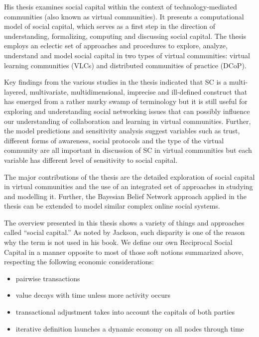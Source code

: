 \documentclass[10pt,oneside]{memoir}
\begin{document}
\begin{Spacing}{2}
His thesis examines social capital within the context of technology-mediated communities (also known as virtual communities). It presents a computational model of social capital, which serves as a first step in the direction of understanding, formalizing, computing and discussing social capital. The thesis employs an eclectic set of approaches and procedures to explore, analyze, understand and model social capital in two types of virtual communities: virtual learning communities (VLCs) and distributed communities of practice (DCoP).


Key findings from the various studies in the thesis indicated that SC is a multi-layered, multivariate, multidimensional, imprecise and ill-defined construct that has emerged from a rather murky swamp of terminology but it is still useful for exploring and understanding social networking issues that can possibly influence our understanding of collaboration and learning in virtual communities. Further, the model predictions and sensitivity analysis suggest variables such as trust, different forms of awareness, social protocols and the type of the virtual community are all important in discussion of SC in virtual communities but each variable has different level of sensitivity to social capital.


The major contributions of the thesis are the detailed exploration of social capital in virtual communities and the use of an integrated set of approaches in studying and modelling it. Further, the Bayesian Belief Network approach applied in the thesis can be extended to model similar complex online social systems.


The overview presented in this thesis shows a variety of things and approaches called ``social capital.''  As noted by Jackson, such disparity is one of the reason why the term is not used in his book.  We define our own Reciprocal Social Capital in a manner opposite to most of those soft notions summarized above, respecting the following economic considerations:


\begin{itemize}


\item pairwise transactions

\item value decays with time unless more activity occurs

\item transactional adjustment takes into account the capitals of both parties

\item iterative definition launches a dynamic economy on all nodes through time 
\end{itemize}


\end{Spacing}
\end{document}

